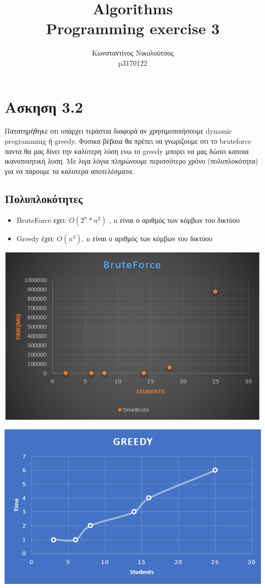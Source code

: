 \documentclass[12pt]{article}
\title{Algorithms \\ Programming exercise 3}
\author{Κωνσταντίνος Νικολούτσος \\ p3170122}
\date{}
\begin{document}
\maketitle


\section{Ασκηση 3.2}
Πατατηρήθηκε οτι υπάρχει τεράστια διαφορά αν χρησιμοποιήσουμε dynamic programming ή greedy. 
Φυσικα βέβαια θα πρέπει να γνωρίζουμε οτι το bruteforce παντα θα μας δίνει την καλύτερη λύση ενω το greedy μπορει να μας δώσει καποια ικανοποιητική λυση. Με λιγα λόγια πληρώνουμε περισσότερο χρόνο (πολυπλοκότητα) για να πάρουμε τα καλυτερα αποτελέσματα.

\subsection{Πολυπλοκότητες}
\begin{itemize}
	\item BruteForce εχει: $O(2^n*n^2)$ , n είναι ο αριθμός των κόμβων του δικτύου
	\item Greedy έχει: $Ο(n^3)$, n είναι ο αριθμός των κόμβων του δικτύου
\end{itemize}

\begin{center}
	\includegraphics[scale = 0.6]{graph_brute.png}
\end{center}

\begin{center}
	\includegraphics[scale = 0.6]{greedy.png}
\end{center}
\end{document}
